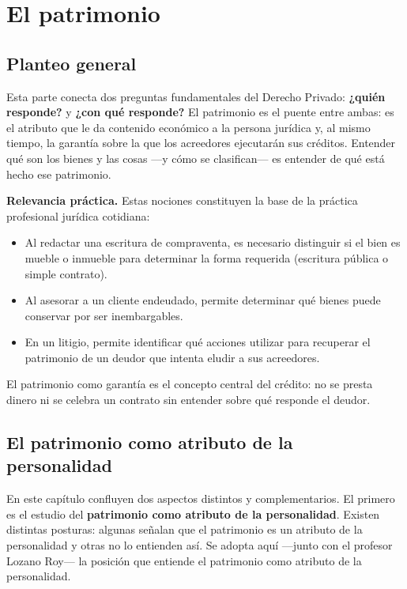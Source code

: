 \documentclass[12pt,oneside]{book}
\begin{document}
\chapter{El patrimonio}

\section{Planteo general}

Esta parte conecta dos preguntas fundamentales del Derecho Privado: \textbf{¿quién responde?} y \textbf{¿con qué responde?} El patrimonio es el puente entre ambas: es el atributo que le da contenido económico a la persona jurídica y, al mismo tiempo, la garantía sobre la que los acreedores ejecutarán sus créditos. Entender qué son los bienes y las cosas ---y cómo se clasifican--- es entender de qué está hecho ese patrimonio.

\begin{note}
\textbf{Relevancia práctica.} Estas nociones constituyen la base de la práctica profesional jurídica cotidiana:
\begin{itemize}
    \item Al redactar una escritura de compraventa, es necesario distinguir si el bien es mueble o inmueble para determinar la forma requerida (escritura pública o simple contrato).
    \item Al asesorar a un cliente endeudado, permite determinar qué bienes puede conservar por ser inembargables.
    \item En un litigio, permite identificar qué acciones utilizar para recuperar el patrimonio de un deudor que intenta eludir a sus acreedores.
\end{itemize}
El patrimonio como garantía es el concepto central del crédito: no se presta dinero ni se celebra un contrato sin entender sobre qué responde el deudor.
\end{note}

\section{El patrimonio como atributo de la personalidad}

En este capítulo confluyen dos aspectos distintos y complementarios. El primero es el estudio del \textbf{patrimonio como atributo de la personalidad}. Existen distintas posturas: algunas señalan que el patrimonio es un atributo de la personalidad y otras no lo entienden así. Se adopta aquí ---junto con el profesor Lozano Roy--- la posición que entiende el patrimonio como atributo de la personalidad.
\end{document}

